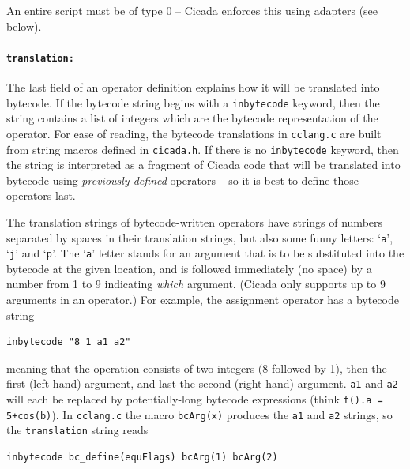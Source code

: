 \documentclass{article}
\newenvironment{code}{
       \begin{list}{}{
               \setlength{\leftmargin}{.4in}
               \setlength{\rightmargin}{0in}
               \setlength{\topsep}{.2in}
       }
       \small
       \item[] }
       { \end{list}   }
\begin{document}
An entire script must be of type 0 -- Cicada enforces this using adapters (see below).



\paragraph{\texttt{translation:}}  The last field of an operator definition explains how it will be translated into bytecode.  If the bytecode string begins with a \verb#inbytecode# keyword, then the string contains a list of integers which are the bytecode representation of the operator.  For ease of reading, the bytecode translations in \verb#cclang.c# are built from string macros defined in \verb#cicada.h#.  If there is no \verb#inbytecode# keyword, then the string is interpreted as a fragment of Cicada code that will be translated into bytecode using \emph{previously-defined} operators -- so it is best to define those operators last.

The translation strings of bytecode-written operators have strings of numbers separated by spaces in their translation strings, but also some funny letters:  `\verb#a#', `\verb#j#' and `\verb#p#'.  The `\verb#a#' letter stands for an argument that is to be substituted into the bytecode at the given location, and is followed immediately (no space) by a number from 1 to 9 indicating \emph{which} argument.  (Cicada only supports up to 9 arguments in an operator.)  For example, the assignment operator has a bytecode string

\begin{code} \begin{verbatim}
inbytecode "8 1 a1 a2"
\end{verbatim} \end{code}

\noindent meaning that the operation consists of two integers (8 followed by 1), then the first (left-hand) argument, and last the second (right-hand) argument.  \verb#a1# and \verb#a2# will each be replaced by potentially-long bytecode expressions (think \verb#f().a = 5+cos(b)#).  In \verb#cclang.c# the macro \verb#bcArg(x)# produces the \verb#a1# and \verb#a2# strings, so the \verb#translation# string reads

\begin{code} \begin{verbatim}
inbytecode bc_define(equFlags) bcArg(1) bcArg(2)
\end{verbatim} \end{code}
\end{document}
